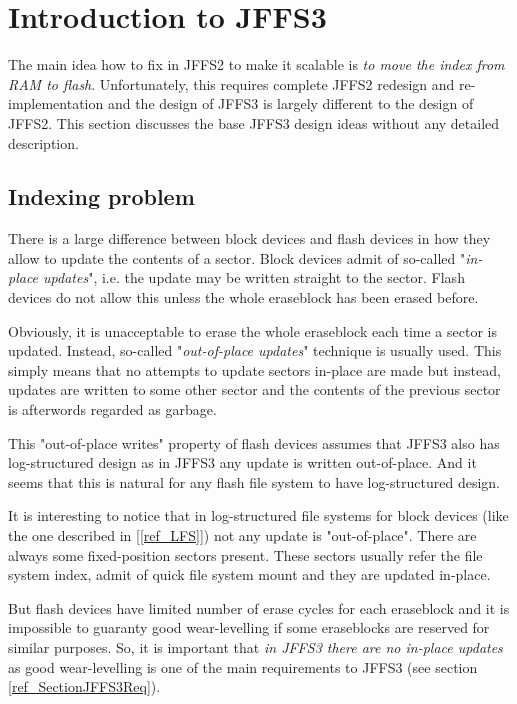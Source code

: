 \documentclass[12pt,a4paper,oneside,titlepage]{article}
\begin{document}
%
%
\section{Introduction to JFFS3}

The main idea how to fix in JFFS2 to make it scalable is \emph{to move the
index from RAM to flash}. Unfortunately, this requires complete JFFS2 redesign
and \mbox{re-implementation} and the design of JFFS3 is largely different to
the design of JFFS2. This section discusses the base JFFS3 design ideas without
any detailed description.

%
%
\subsection{Indexing problem}

There is a large difference between block devices and flash devices in how they
allow to update the contents of a sector. Block devices admit of
\mbox{so-called} "\emph{\mbox{in-place} updates}", i.e. the update may be
written straight to the sector. Flash devices do not allow this unless the
whole eraseblock has been erased before.

Obviously, it is unacceptable to erase the whole eraseblock each time a sector
is updated. Instead, \mbox{so-called} "\emph{\mbox{out-of-place} updates}"
technique is usually used. This simply means that no attempts to update
sectors \mbox{in-place} are made but instead, updates are written to some
other sector and the contents of the previous sector is afterwords regarded as
garbage.

This "\mbox{out-of-place} writes" property of flash devices assumes that JFFS3
also has \mbox{log-structured} design as in JFFS3 any update is written
\mbox{out-of-place}. And it seems that this is natural for any flash file
system to have log-structured design.

It is interesting to notice that in \mbox{log-structured} file systems for
block devices (like the one described in [\ref{ref_LFS}]) not any update is
"\mbox{out-of-place}". There are always some \mbox{fixed-position} sectors
present. These sectors usually refer the file system index, admit of quick
file system mount and they are updated \mbox{in-place}.

But flash devices have limited number of erase cycles for each eraseblock and
it is impossible to guaranty good \mbox{wear-levelling} if some eraseblocks are
reserved for similar purposes. So, it is important that \emph{in JFFS3 there
are no \mbox{in-place} updates} as good \mbox{wear-levelling} is one of the
main requirements to JFFS3 (see section \ref{ref_SectionJFFS3Req}).
\end{document}
